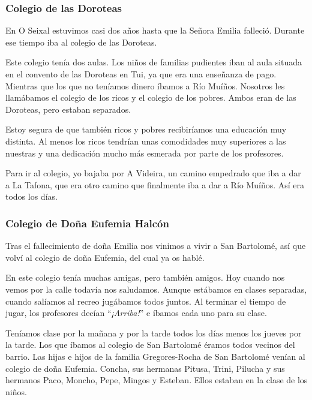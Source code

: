 \documentclass[12pt,a5paper]{book}
\begin{document}





\subsubsection*{Colegio de las Doroteas}

En O Seixal estuvimos casi dos años hasta que la Señora Emilia falleció. Durante ese tiempo iba al colegio de las Doroteas.

Este colegio tenía dos aulas. Los niños de familias pudientes iban al aula situada en el convento de las Doroteas en Tui, ya que era una enseñanza de pago. Mientras que los que no teníamos dinero íbamos a Río Muíños. Nosotros les llamábamos el colegio de los ricos y el colegio de los pobres. Ambos eran de las Doroteas, pero estaban separados.

Estoy segura de que también ricos y pobres recibiríamos una educación muy distinta. Al menos los ricos tendrían unas comodidades muy superiores a las nuestras y una dedicación mucho más esmerada por parte de los profesores.

Para ir al colegio, yo bajaba por A Videira, un camino empedrado que iba a dar a La Tafona, que era otro camino que finalmente iba a dar a Río Muíños. Así era todos los días.


\subsubsection*{Colegio de Doña Eufemia Halcón}

Tras el fallecimiento de doña Emilia nos vinimos a vivir a San Bartolomé, así que volví al colegio de doña Eufemia, del cual ya os hablé.

En este colegio tenía muchas amigas, pero también amigos. Hoy cuando nos vemos por la calle todavía nos saludamos. Aunque estábamos en clases separadas, cuando salíamos al recreo jugábamos todos juntos. Al terminar el tiempo de jugar, los profesores decían ``\textit{¡Arriba!}'' e íbamos cada uno para su clase. 

Teníamos clase por la mañana y por la tarde todos los días menos los jueves por la tarde. Los que íbamos al colegio de San Bartolomé éramos todos vecinos del barrio. Las hijas e hijos de la familia Gregores-Rocha de San Bartolomé venían al colegio de doña Eufemia. Concha, sus hermanas Pitusa, Trini, Pilucha y sus hermanos Paco, Moncho, Pepe, Mingos y Esteban. Ellos estaban en la clase de los niños.
\end{document}
